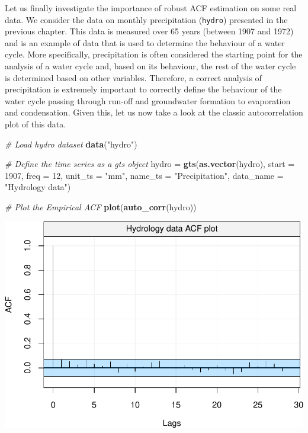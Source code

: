 \documentclass[]{book}
\newenvironment{Shaded}{\begin{snugshade}}{\end{snugshade}}
\newcommand{\CommentTok}[1]{\textcolor[rgb]{0.56,0.35,0.01}{\textit{#1}}}
\newcommand{\DataTypeTok}[1]{\textcolor[rgb]{0.13,0.29,0.53}{#1}}
\newcommand{\DecValTok}[1]{\textcolor[rgb]{0.00,0.00,0.81}{#1}}
\newcommand{\KeywordTok}[1]{\textcolor[rgb]{0.13,0.29,0.53}{\textbf{#1}}}
\newcommand{\NormalTok}[1]{#1}
\newcommand{\StringTok}[1]{\textcolor[rgb]{0.31,0.60,0.02}{#1}}
\theoremstyle{definition}
\theoremstyle{definition}
\theoremstyle{definition}
\theoremstyle{remark}
\begin{document}
Let us finally investigate the importance of robust ACF estimation on
some real data. We consider the data on monthly precipitation
(\texttt{hydro}) presented in the previous chapter. This data is
measured over 65 years (between 1907 and 1972) and is an example of data
that is used to determine the behaviour of a water cycle. More
specifically, precipitation is often considered the starting point for
the analysis of a water cycle and, based on its behaviour, the rest of
the water cycle is determined based on other variables. Therefore, a
correct analysis of precipitation is extremely important to correctly
define the behaviour of the water cycle passing through run-off and
groundwater formation to evaporation and condensation. Given this, let
us now take a look at the classic autocorrelation plot of this data.

\begin{Shaded}
\begin{Highlighting}[]
\CommentTok{# Load hydro dataset}
\KeywordTok{data}\NormalTok{(}\StringTok{"hydro"}\NormalTok{)}

\CommentTok{# Define the time series as a gts object}
\NormalTok{hydro =}\StringTok{ }\KeywordTok{gts}\NormalTok{(}\KeywordTok{as.vector}\NormalTok{(hydro), }\DataTypeTok{start =} \DecValTok{1907}\NormalTok{, }\DataTypeTok{freq =} \DecValTok{12}\NormalTok{, }\DataTypeTok{unit_ts =} \StringTok{"mm"}\NormalTok{, }\DataTypeTok{name_ts =} \StringTok{"Precipitation"}\NormalTok{, }\DataTypeTok{data_name =} \StringTok{"Hydrology data"}\NormalTok{)}

\CommentTok{# Plot the Empirical ACF}
\KeywordTok{plot}\NormalTok{(}\KeywordTok{auto_corr}\NormalTok{(hydro))}
\end{Highlighting}
\end{Shaded}

\includegraphics{ts_files/figure-latex/unnamed-chunk-23-1.pdf}
\end{document}
